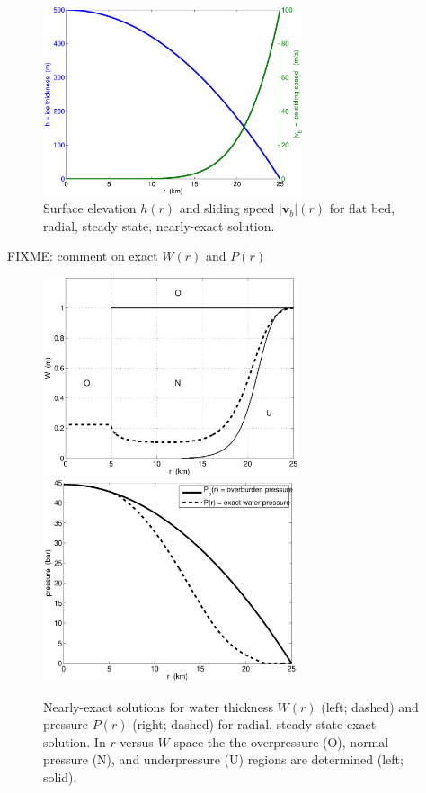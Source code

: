 \documentclass[11pt,final]{amsart}%
\newcommand\bv{\mathbf{v}}
\begin{document}
\begin{figure}[ht]
\includegraphics[width=3.0in,keepaspectratio=true]{figs/h-vb-plot}
\caption{Surface elevation $h(r)$ and sliding speed $|\bv_b|(r)$ for flat bed, radial, steady state, nearly-exact solution.}
\label{fig:h-vb}
\end{figure}



FIXME: comment on exact $W(r)$ and $P(r)$

\begin{figure}[ht]
\includegraphics[height=2.3in,keepaspectratio=true]{figs/exact-W-plot-onu} \, 
\includegraphics[height=2.33in,keepaspectratio=true]{figs/exact-P-plot}
\caption{Nearly-exact solutions for water thickness $W(r)$ (left; dashed) and pressure $P(r)$ (right; dashed) for radial, steady state exact solution.  In $r$-versus-$W$ space the the overpressure (O), normal pressure (N), and underpressure (U) regions are determined (left; solid).}
\label{fig:WPexact}
\end{figure}
\end{document}
